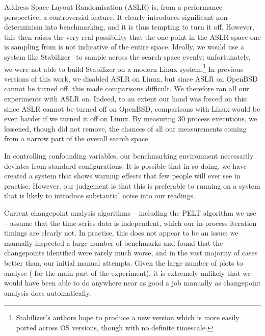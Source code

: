 \documentclass[acmlarge]{acmart}\settopmatter{printfolios=true}
\newcommand{\numpexecs}{30\xspace}
\begin{document}
Address Space Layout Randomisation (ASLR) is, from a performance perspective, a
controversial feature. It clearly introduces significant non-determinism into
benchmarking, and it is thus tempting to turn it off. However, this then raises
the very real possibility that the one point in the ASLR space one is sampling
from is not indicative of the entire space. Ideally, we would use a system like
Stabilizer~\cite{curtsinger13stabilizer} to
sample across the search space evenly; unfortunately, we were not able to build
Stabilizer on a modern Linux system.\footnote{Stabilizer's authors hope to
produce a new version which is more easily ported across OS versions, though
with no definite timescale.} In previous versions of this work, we disabled
ASLR on Linux, but since ASLR on OpenBSD cannot be turned off, this made
comparisons difficult. We therefore ran all our experiments with ASLR on.
Indeed, to an extent our hand was forced on this: since ASLR cannot be turned
off on OpenBSD, comparisons with Linux would be even harder if we turned it off
on Linux. By measuring \numpexecs process executions, we lessened, though did not
remove, the chances of all our measurements coming from a narrow part of the
overall search space

In controlling confounding variables, our benchmarking environment necessarily
deviates from standard configurations. It is possible that in so doing, we have
created a system that shows warmup effects that few people will ever see in
practise. However, our judgement is that this is preferable to running on a
system that is likely to introduce substantial noise into our readings.

Current changepoint analysis algorithms -- including the PELT algorithm we use
-- assume that the time-series data is independent, which our in-process
iteration timings are clearly not. In practise, this does not appear to be an
issue: we manually inspected a large number of benchmarks and found that the
changepoints identified were rarely much worse, and in the vast majority of
cases better than, our initial manual attempts. Given the large number of
plots to analyse (\totalpexecs{} for the main part of the experiment), it is extremely unlikely that
we would have been able to do anywhere near as good a job manually as
changepoint analysis does automatically.
\end{document}
